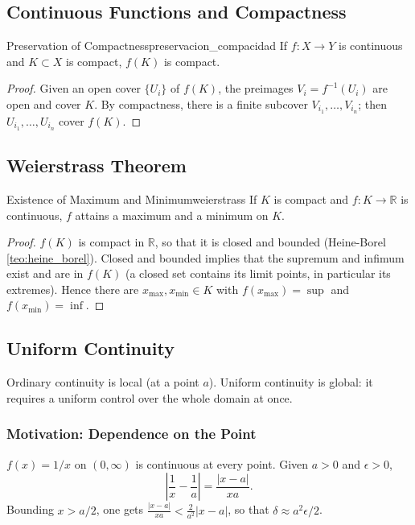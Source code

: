 \documentclass[11pt, a4paper]{article}
\begin{document}
\subsection{Continuous Functions and Compactness}

\begin{teorema}{Preservation of Compactness}{preservacion_compacidad}
If $f: X \to Y$ is continuous and $K \subset X$ is compact, $f(K)$ is compact.
\end{teorema}

\begin{proof}
Given an open cover $\{U_i\}$ of $f(K)$, the preimages $V_i = f^{-1}(U_i)$ are open
and cover $K$. By compactness, there is a finite subcover $V_{i_1}, \dots, V_{i_n}$; then
$U_{i_1}, \dots, U_{i_n}$ cover $f(K)$.
\end{proof}

\subsection{Weierstrass Theorem}

\begin{corolario}{Existence of Maximum and Minimum}{weierstrass}
If $K$ is compact and $f: K \to \mathbb{R}$ is continuous, $f$ attains a maximum and a minimum on $K$.
\end{corolario}

\begin{proof}
$f(K)$ is compact in $\mathbb{R}$, so that it is closed and bounded (Heine-Borel
\ref{teo:heine_borel}). Closed and bounded
implies that the supremum and infimum exist and are in $f(K)$ (a closed set contains its limit
points, in particular its extremes). Hence there are $x_{\max}, x_{\min} \in K$ with
$f(x_{\max}) = \sup$ and $f(x_{\min}) = \inf$.
\end{proof}

\subsection{Uniform Continuity}

Ordinary continuity is local (at a point $a$). Uniform continuity is global: it requires a uniform
control over the whole domain at once.

\subsubsection{Motivation: Dependence on the Point}

$f(x) = 1/x$ on $(0, \infty)$ is continuous at every point. Given $a > 0$ and $\epsilon > 0$,
$$ \left|\frac{1}{x} - \frac{1}{a}\right| = \frac{|x-a|}{xa}. $$
Bounding $x > a/2$, one gets $\frac{|x-a|}{xa} < \frac{2}{a^2}|x-a|$, so that
$\delta \approx a^2 \epsilon / 2$.
\end{document}
